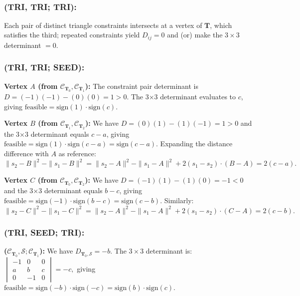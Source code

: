\documentclass[12pt]{article}
\makeatletter
\theoremstyle{definition}
\theoremstyle{remark}
\renewenvironment{proof}[1][\proofname]{\par
  \pushQED{\qed}%
  \normalfont \footnotesize \topsep6\p@\@plus6\p@\relax
  \list{}{\leftmargin=2em
          \settowidth{\itemindent}{\itshape#1}%
          \labelwidth=\itemindent
          \parsep=0pt \listparindent=\parindent 
  }
  \item[\hskip\labelsep
        \itshape
    #1\@addpunct{.}]\ignorespaces
}{%
  \popQED\endlist\@endpefalse
}
\makeatother
\begin{document}
\FloatBarrier
\begin{proof}
~

\subsubsection*{(TRI, TRI; TRI):}
Each pair of distinct triangle constraints intersects at a vertex of
$\mathbf{T}$, which satisfies the third; repeated constraints yield
$D_{ij} = 0$ and (or) make the $3 \times 3$ determinant $=0$.

\subsubsection*{(TRI, TRI; SEED):}

\textbf{Vertex $A$ (from $\mathcal{C}_{\mathbf{T}_0}, \mathcal{C}_{\mathbf{T}_1}$):}
The constraint pair determinant is $D = (-1)(-1) - (0)(0) = 1 > 0$.
The 3×3 determinant evaluates to $c$, giving $\mathrm{feasible} = \mathrm{sign}(1) \cdot \mathrm{sign}(c)$.

\noindent
\textbf{Vertex $B$ (from $\mathcal{C}_{\mathbf{T}_1}, \mathcal{C}_{\mathbf{T}_2}$):}
We have $D = (0)(1) - (1)(-1) = 1 > 0$ and the 3×3 determinant equals $c - a$, giving $\mathrm{feasible} = \mathrm{sign}(1) \cdot \mathrm{sign}(c - a) = \mathrm{sign}(c - a)$.
Expanding the distance difference with $A$ as reference:
$
    \|s_2 - B\|^2 - \|s_1 - B\|^2 = \|s_2 - A\|^2 - \|s_1 - A\|^2 + 2(s_1 - s_2) \cdot (B - A) = 2(c - a).
$

\noindent
\textbf{Vertex $C$ (from $\mathcal{C}_{\mathbf{T}_0}, \mathcal{C}_{\mathbf{T}_2}$):}
We have $D = (-1)(1) - (1)(0) = -1 < 0$ and the 3×3 determinant equals $b - c$, giving $\mathrm{feasible} = \mathrm{sign}(-1) \cdot \mathrm{sign}(b - c) = \mathrm{sign}(c - b)$.
Similarly:
$
    \|s_2 - C\|^2 - \|s_1 - C\|^2 = \|s_2 - A\|^2 - \|s_1 - A\|^2 + 2(s_1 - s_2) \cdot (C - A) = 2(c - b).
$

\subsubsection*{(TRI, SEED; TRI):}

\textbf{($\mathcal{C}_{\mathbf{T}_0}, \mathcal{S}; \mathcal{C}_{\mathbf{T}_1}$):} We have $D_{\mathbf{T}_0, \mathcal{S}} = -b$. The $3\times 3$ determinant is:
$
    \begin{vmatrix}
        -1   & 0  & 0   \\
        a & b & c \\
        0  & -1   & 0
    \end{vmatrix} = -c,
$
giving $\mathrm{feasible} = \mathrm{sign}(-b) \cdot \mathrm{sign}(-c) = \mathrm{sign}(b) \cdot \mathrm{sign}(c)$.


\end{proof}
\end{document}
